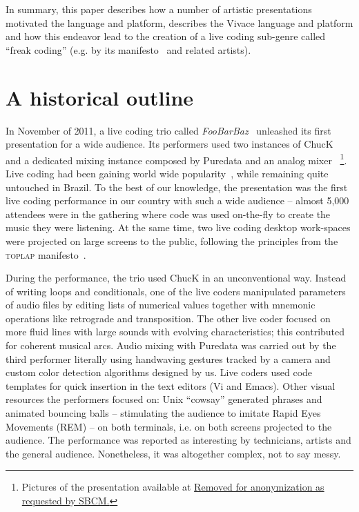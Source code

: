 \documentclass[12pt,times,twocolumn]{article}
\begin{document}
In summary, this paper describes how
a number of artistic presentations motivated the language and platform,
describes the Vivace language and platform and how this endeavor
lead to the creation of a live coding sub-genre
called ``freak coding'' (e.g. by its manifesto~\cite{freak} and related artists).

\section{A historical outline} %
In November of 2011, a live coding trio called
\textit{FooBarBaz}~\cite{foobarbaz} unleashed its first presentation
for a wide audience. Its performers used two instances of
ChucK~\cite{wang2003chuck} and a dedicated mixing instance composed by Puredata and an analog
mixer
~\footnote{Pictures of the presentation available at
  \url{Removed for anonymization as requested by SBCM.}}.
  Live coding had been gaining world wide popularity~\cite{nilson2007live,
  collins2003live, brown2007a, collins2011live}, while remaining quite
untouched in Brazil.
To the best of our knowledge, the presentation
was the first live coding performance in our country with such a wide audience -- almost 5,000
attendees were in the gathering where code was used on-the-fly to
create the music they were listening.
At the same time, two live coding desktop work-spaces were projected on large screens to the
public, following the principles from the \textsc{toplap} manifesto~\cite{ward2004live}.

During the performance, the trio used ChucK in an unconventional
way. Instead of writing loops and conditionals, one of the live coders
manipulated parameters of audio files by editing lists of numerical
values together with mnemonic operations like retrograde and
transposition. The other live coder focused on more fluid lines with
large sounds with evolving characteristics; this contributed for coherent
musical arcs. Audio mixing with Puredata was carried out by
the third performer literally using handwaving gestures tracked by a
camera and custom color detection algorithms designed by us. Live coders
used code templates for quick insertion in the text editors (Vi
and Emacs).
Other visual resources the performers focused on:
Unix ``cowsay'' generated phrases and animated bouncing balls
-- stimulating the audience to imitate Rapid Eyes
Movements (REM) -- on both terminals, i.e. on both screens projected to the audience.
The performance was reported as interesting by technicians,
artists and the general audience.
Nonetheless, it was altogether complex, not to say messy.
\end{document}
